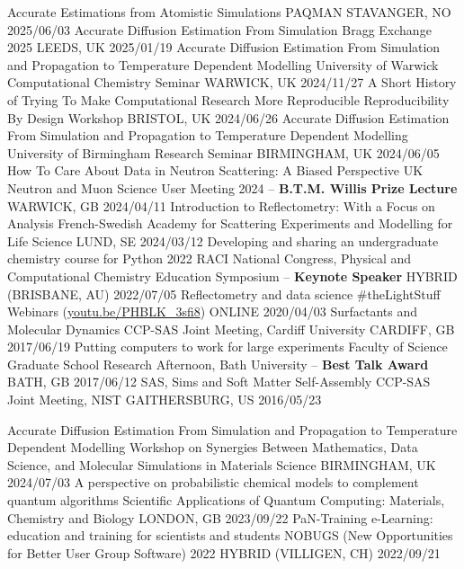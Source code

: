 \vspace{-0.4cm}
\begin{cvhonors}
  \cvhonor
    {Accurate Estimations from Atomistic Simulations}
    {PAQMAN}
    {STAVANGER, NO}
    {2025/06/03}
  \cvhonor
    {Accurate Diffusion Estimation From Simulation}
    {Bragg Exchange 2025}
    {LEEDS, UK}
    {2025/01/19}
  \cvhonor
    {Accurate Diffusion Estimation From Simulation and Propagation to Temperature Dependent Modelling}
    {University of Warwick Computational Chemistry Seminar}
    {WARWICK, UK}
    {2024/11/27}
  \cvhonor
    {A Short History of Trying To Make Computational Research More Reproducible}
    {Reproducibility By Design Workshop}
    {BRISTOL, UK}
    {2024/06/26}
  \cvhonor
    {Accurate Diffusion Estimation From Simulation and Propagation to Temperature Dependent Modelling}
    {University of Birmingham Research Seminar}
    {BIRMINGHAM, UK}
    {2024/06/05}
  \cvhonor
    {How To Care About Data in Neutron Scattering: A Biased Perspective}
    {UK Neutron and Muon Science User Meeting 2024 -- \textbf{B.T.M. Willis Prize Lecture}}
    {WARWICK, GB}
    {2024/04/11}
  \cvhonor
    {Introduction to Reflectometry: With a Focus on Analysis}
    {French-Swedish Academy for Scattering Experiments and Modelling for Life Science}
    {LUND, SE}
    {2024/03/12}
  \cvhonor
    {Developing and sharing an undergraduate chemistry course for Python}
    {2022 RACI National Congress, Physical and Computational Chemistry Education Symposium -- \textbf{Keynote Speaker}}
    {HYBRID (BRISBANE, AU)}
    {2022/07/05}
  \cvhonor
    {Reflectometry and data science}
    {\#theLightStuff Webinars (\href{https://youtu.be/PHBLK_3sfi8}{youtu.be/PHBLK\_3sfi8})}
    {ONLINE}
    {2020/04/03}
  \cvhonor
    {Surfactants and Molecular Dynamics}
    {CCP-SAS Joint Meeting, Cardiff University}
    {CARDIFF, GB}
    {2017/06/19}
  \cvhonor
    {Putting computers to work for large experiments}
    {Faculty of Science Graduate School Research Afternoon, Bath University -- \textbf{Best Talk Award}}
    {BATH, GB}
    {2017/06/12}
  \cvhonor
    {SAS, Sims and Soft Matter Self-Assembly}
    {CCP-SAS Joint Meeting, NIST}
    {GAITHERSBURG, US}
    {2016/05/23}
\end{cvhonors}
\begin{cvhonors}
  \cvhonor
    {Accurate Diffusion Estimation From Simulation and Propagation to Temperature Dependent Modelling}
    {Workshop on Synergies Between Mathematics, Data Science, and Molecular Simulations in Materials Science}
    {BIRMINGHAM, UK}
    {2024/07/03}
  \cvhonor
    {A perspective on probabilistic chemical models to complement quantum algorithms}
    {Scientific Applications of Quantum Computing: Materials, Chemistry and Biology}
    {LONDON, GB}
    {2023/09/22}
  \cvhonor
    {PaN-Training e-Learning: education and training for scientists and students}
    {NOBUGS (New Opportunities for Better User Group Software) 2022}
    {HYBRID (VILLIGEN, CH)}
    {2022/09/21}
\end{cvhonors}
